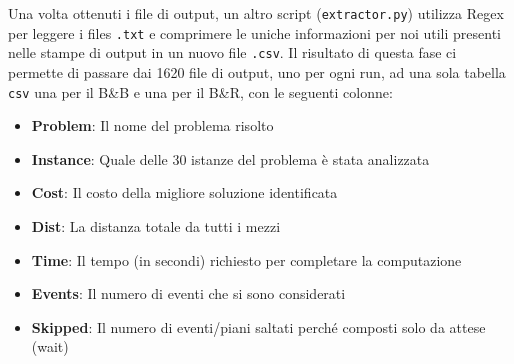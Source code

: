\documentclass[
    article,            %
    12pt,                %
    oneside,            %
    a4paper,            %
    english,            %
    italian,                %
    sumario=tradicional,
]{abntex2}
\begin{document}
Una volta ottenuti i file di output, un altro script (\texttt{extractor.py}) utilizza Regex per leggere i files \texttt{.txt} e comprimere le uniche informazioni per noi utili presenti nelle stampe di output in un nuovo file \texttt{.csv}. Il risultato di questa fase ci permette di passare dai 1620 file di output, uno per ogni run, ad una sola tabella \texttt{csv} una per il B\&B e una per il B\&R, con le seguenti colonne: 
\begin{itemize}
    \item \textbf{Problem}: Il nome del problema risolto
    \item \textbf{Instance}: Quale delle 30 istanze del problema è stata analizzata
    \item \textbf{Cost}: Il costo della migliore soluzione identificata
    \item\textbf{Dist}: La distanza totale da tutti i mezzi
    \item\textbf{Time}: Il tempo (in secondi) richiesto per completare la computazione
    \item \textbf{Events}: Il numero di eventi che si sono considerati
    \item \textbf{Skipped}: Il numero di eventi/piani saltati perché composti solo da attese (wait)
\end{itemize}
\end{document}
